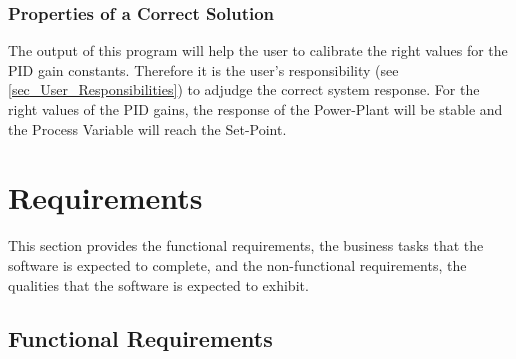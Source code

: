 \documentclass[12pt]{article}
\begin{document}
\subsubsection{Properties of a Correct Solution} \label{sec_CorrectSolution}

\noindent
The output of this program will help the user to calibrate the right values for 
the PID gain constants. Therefore it is the user's responsibility (see 
\ref{sec_User_Responsibilities}) to adjudge the correct system response. 
For the right values of the PID gains, the response of the Power-Plant will be stable and 
the Process Variable will reach the Set-Point.

  


\section{Requirements}


This section provides the functional requirements, the business tasks that the
software is expected to complete, and the non-functional requirements, the
qualities that the software is expected to exhibit.

\subsection{Functional Requirements}
\end{document}
